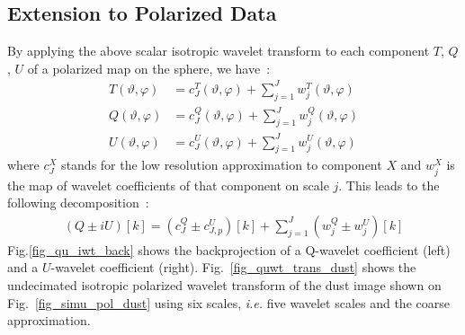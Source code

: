 \subsection{Extension to Polarized Data}
By applying the above scalar isotropic wavelet transform to each component $T$, $Q$, $U$ of a polarized map on the sphere, we have~:
\begin{eqnarray}
\label{tqu_iwt}
T(\vartheta, \varphi) & = c_{J}^T (\vartheta, \varphi)+ \sum_{j=1}^{J} w_j^T  (\vartheta, \varphi)\\ \nonumber
Q(\vartheta, \varphi) & = c_{J}^Q (\vartheta, \varphi)+ \sum_{j=1}^{J} w_j^Q (\vartheta, \varphi)\\ \nonumber
U(\vartheta, \varphi) & = c_{J}^U (\vartheta, \varphi)+ \sum_{j=1}^{J} w_j^U (\vartheta, \varphi)
\end{eqnarray}
where $c_{J}^X$ stands for the low resolution approximation to component $X$ and $w_j^X$ is the map of wavelet coefficients of that component on scale $j$. This leads to the following decomposition~:
\begin{eqnarray}
(Q \pm iU)[k] =    (c^Q_{J} \pm c^U_{J,p})[k]   +   \sum_{j=1}^J   ( w_{j}^Q \pm w_{j}^U )[k]
\label{eq_qu_rec_uwt}
\end{eqnarray}
Fig.\ref{fig_qu_iwt_back} shows the backprojection of a Q-wavelet coefficient (left) and a $U$-wavelet coefficient (right).
Fig.~\ref{fig_quwt_trans_dust} shows the undecimated isotropic polarized wavelet transform of the dust image shown on 
Fig.~\ref{fig_simu_pol_dust} using six scales, \textit{i.e.} five wavelet scales and the coarse approximation.
